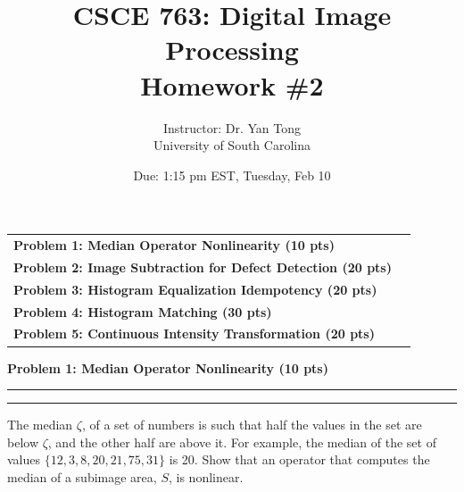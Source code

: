 \documentclass[12pt]{article}
\title{CSCE 763: Digital Image Processing \\ Homework \#2}
\author{Instructor: Dr. Yan Tong \\ University of South Carolina}
\date{Due: 1:15 pm EST, Tuesday, Feb 10}
\newcommand{\question}[1]{%
  \clearpage
  \vspace{0.5cm}
  {\noindent\normalsize \textbf{#1}}
  \vspace{0.2cm}
  \hrule
  \vspace{0.1cm}
  \hrule
  \vspace{0.3cm}
}
\begin{document}
\maketitle
\setlength{\parindent}{0pt}



\begin{center}
\begin{tcolorbox}[colback=white, colframe=gray!50!black, colbacktitle=gray!20!white,
                  coltitle=black, sharp corners, boxrule=1pt,
                  title=\Large\bfseries Table of Contents]
\begin{tabular}{p{}r}
\textbf{Problem 1: Median Operator Nonlinearity (10 pts)} \dotfill & \textbf{\pageref{quest:1}} \\[0.3em]
\textbf{Problem 2: Image Subtraction for Defect Detection (20 pts)} \dotfill & \textbf{\pageref{quest:2}} \\[0.3em]
\textbf{Problem 3: Histogram Equalization Idempotency (20 pts)} \dotfill & \textbf{\pageref{quest:3}} \\[0.3em]
\textbf{Problem 4: Histogram Matching (30 pts)} \dotfill & \textbf{\pageref{quest:4}} \\[0.3em]
\textbf{Problem 5: Continuous Intensity Transformation (20 pts)} \dotfill & \textbf{\pageref{quest:5}} \\
\end{tabular}
\vspace{0.2cm}
\end{tcolorbox}
\end{center}

\vspace{0.5cm}


\question{Problem 1: Median Operator Nonlinearity (10 pts)}\label{quest:1}

The median $\zeta$, of a set of numbers is such that half the values in the set are below $\zeta$, and the other half are above it. For example, the median of the set of values $\{12, 3, 8, 20, 21, 75, 31\}$ is 20. Show that an operator that computes the median of a subimage area, $S$, is nonlinear.
\end{document}
